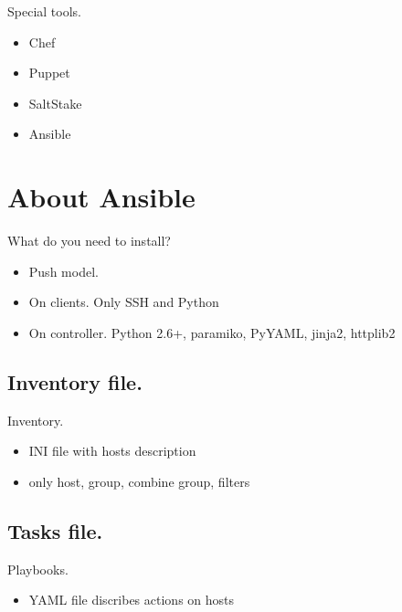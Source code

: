 \documentclass{beamer}
\begin{document}
\begin{frame}{Special tools.}
  \begin{itemize}
  \item
    Chef
  \item
    Puppet
  \item
    SaltStake
  \item
    Ansible
  \end{itemize}
\end{frame}



\section{About Ansible}
\begin{frame}{What do you need to install?}
  \begin{itemize}
  \item
  Push model.
  \item
  On clients. Only SSH and Python
  \item
  On controller. Python 2.6+, paramiko, PyYAML, jinja2, httplib2
  \end{itemize}
\end{frame}

\subsection{Inventory file.}

\lstset{style=custom_hosts}
\begin{frame}{Inventory.}
  \begin{itemize}
  \item
  INI file with hosts description
  \item
  only host, group, combine group, filters 
  \end{itemize}
  
\end{frame}

\subsection{Tasks file.}
\begin{frame}{Playbooks.}
  \begin{itemize}
  \item
  YAML file discribes actions on hosts
  \end{itemize}
  
\end{frame}
\end{document}

